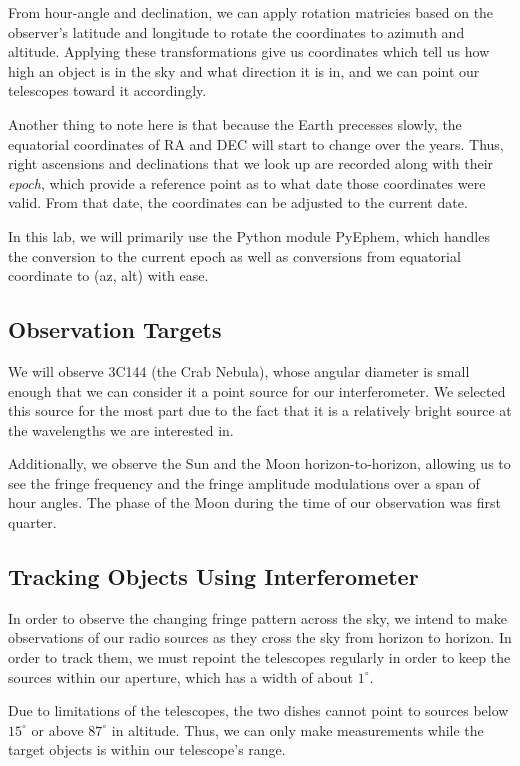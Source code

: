 \documentclass[12pt]{article}
\begin{document}
From hour-angle and declination, we can apply rotation matricies based on the observer's latitude and longitude to rotate the coordinates to azimuth and altitude. Applying these transformations give us  coordinates which tell us how high an object is in the sky and what direction it is in, and we can point our telescopes toward it accordingly.

Another thing to note here is that because the Earth precesses slowly, the equatorial coordinates of RA and DEC will start to change over the years. Thus, right ascensions and declinations that we look up are recorded along with their \textit{epoch}, which provide a reference point as to what date those coordinates were valid. From that date, the coordinates can be adjusted to the current date.

In this lab, we will primarily use the Python module PyEphem, which handles the conversion to the current epoch as well as conversions from equatorial coordinate to (az, alt) with ease.

\subsection{Observation Targets}
We will observe 3C144 (the Crab Nebula), whose angular diameter is small enough that we can consider it a point source for our interferometer. We selected this source for the most part due to the fact that it is a relatively bright source at the wavelengths we are interested in.

Additionally, we observe the Sun and the Moon horizon-to-horizon, allowing us to see the fringe frequency and the fringe amplitude modulations over a span of hour angles. The phase of the Moon during the time of our observation was first quarter.

\subsection{Tracking Objects Using Interferometer}
In order to observe the changing fringe pattern across the sky, we intend to make observations of our radio sources as they cross the sky from horizon to horizon. In order to track them, we must repoint the telescopes regularly in order to keep the sources within our aperture, which has a width of about $1^\circ$.

Due to limitations of the telescopes, the two dishes cannot point to sources below $15^\circ$ or above $87^\circ$ in altitude. Thus, we can only make measurements while the target objects is within our telescope's range.
\end{document}
